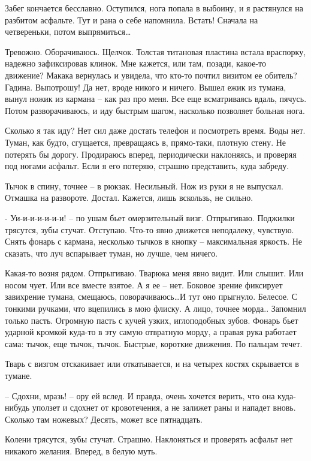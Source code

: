 \documentclass[a4paper]{book}
\begin{document}
Забег кончается бесславно. Оступился, нога попала в выбоину, и я растянулся на разбитом асфальте. Тут и рана о себе напомнила. Встать! Сначала на четвереньки, потом выпрямиться\ldots 

Тревожно. Оборачиваюсь. Щелчок. Толстая титановая пластина встала враспорку, надежно зафиксировав клинок. Мне кажется, или там, позади, какое-то движение? Макака вернулась и увидела, что кто-то почтил визитом ее обитель? Гадина. Выпотрошу! Да нет, вроде никого и ничего. Вышел ежик из тумана, вынул ножик из кармана -- как раз про меня. Все еще всматриваясь вдаль, пячусь. Потом разворачиваюсь, и иду быстрым шагом, насколько позволяет больная нога.

Сколько я так иду? Нет сил даже достать телефон и посмотреть время. Воды нет. Туман, как будто, сгущается, превращаясь в, прямо-таки, плотную стену. Не потерять бы дорогу. Продираюсь вперед, периодически наклоняясь, и проверяя под ногами асфальт. Если я его потеряю, страшно представить, куда забреду. 

Тычок в спину, точнее --  в рюкзак. Несильный. Нож из руки я не выпускал. Отмашка на развороте. Достал. Кажется, лишь вскользь, не сильно.

- Уи-и-и-и-и-и-и! -- по ушам бьет омерзительный визг. Отпрыгиваю. Поджилки трясутся, зубы стучат. Отступаю. Что-то явно движется неподалеку, чувствую. Снять фонарь с кармана, несколько тычков в кнопку -- максимальная яркость. Не сказать, что луч вспарывает туман, но лучше, чем ничего.

Какая-то возня рядом. Отпрыгиваю. Тварюка меня явно видит. Или слышит. Или носом чует. Или все вместе взятое. А я ее -- нет. Боковое зрение фиксирует завихрение тумана, смещаюсь, поворачиваюсь\ldots И тут оно прыгнуло. Белесое. С тонкими ручками, что вцепились в мою флиску. А лицо, точнее морда.. Запомнил только пасть. Огромную пасть с кучей узких, иглоподобных зубов. Фонарь бьет ударной кромкой куда-то в эту самую отвратную морду, а правая рука работает сама: тычок, еще тычок, тычок. Быстрые, короткие движения. По пальцам течет.

Тварь с визгом отскакивает или откатывается, и на четырех костях скрывается в тумане. 

-- Сдохни, мразь! -- ору ей вслед. И правда, очень хочется верить, что она куда-нибудь уползет и сдохнет от кровотечения, а не залижет раны и нападет вновь. Сколько там ножевых? Десять, может все пятнадцать.

Колени трясутся, зубы стучат. Страшно. Наклоняться и проверять асфальт нет никакого желания. Вперед, в белую муть.
\\
\end{document}
